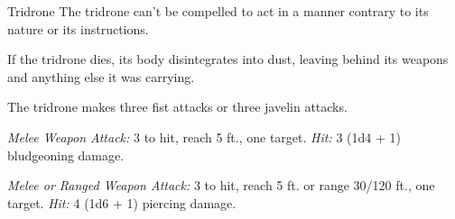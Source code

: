 \documentclass[10pt,a4paper,twoside,bg=print,twocolumn,openany,nodeprecatedcode]{dndarticle}
\begin{document}
\begin{DndMonster}[float=t]{Tridrone}
\DndMonsterBasics[
armor-class = {15 (natural armor)},
hit-points = {\DndDice{3d8 + 3}},
speed = {30 ft.}
]
\DndMonsterAbilityScores[
 str = 12,
 dex = 13,
 con = 12,
 int = 9,
 wis = 10,
 cha = 9
]
\DndMonsterDetails[
senses = {truesight 120 ft., passive perception 10},
languages = {Modron},
challenge = 1/2,
]
The tridrone can't be compelled to act in a manner contrary to its nature or its instructions.

If the tridrone dies, its body disintegrates into dust, leaving behind its weapons and anything else it was carrying.

The tridrone makes three fist attacks or three javelin attacks.

\textsl{Melee Weapon Attack:} 3 to hit, reach 5 ft., one target. \textsl{Hit:} 3 (1d4 + 1) bludgeoning damage.

\textsl{Melee or Ranged Weapon Attack:} 3 to hit, reach 5 ft. or range 30/120 ft., one target. \textsl{Hit:} 4 (1d6 + 1) piercing damage.

\end{DndMonster}
\end{document}
